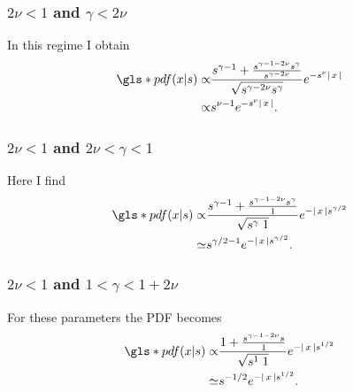 \subsubsection{$2\nu<1$ and $\gamma< 2\nu$ }

In this regime I obtain  
%
\begin{align}
\gls*{pdf}(x|s) \propto & \frac{s^{\gamma-1}+\frac{s^{\gamma-1-2\nu} s^{\gamma}}{s^{\gamma-2\nu}}}{\sqrt{s^{\gamma -2\nu}s^{\gamma}}} e^{-s^{\nu} \abs{x}} \\
\propto & s^{\nu - 1} e^{-s^{\nu} \abs{x}} .
\end{align}
%

\subsubsection{$2\nu<1$ and $2\nu <\gamma< 1$ }

Here I find 
%
\begin{align}
\gls*{pdf}(x|s) \propto & \frac{s^{\gamma-1}+\frac{s^{\gamma-1-2\nu} s^{\gamma}}{1}}{\sqrt{s^{\gamma } \; 1}} e^{-\abs{x} s^{\gamma/2}} \\
\simeq & s^{\gamma/2-1} e^{-\abs{x} s^{\gamma/2}} .
\end{align}
%

\subsubsection{$2\nu<1$ and $1 <\gamma< 1+2\nu$}

For these parameters the \gls*{PDF} becomes
%
\begin{align}
\gls*{pdf}(x|s) \propto & \frac{1+\frac{s^{\gamma-1-2\nu} s}{1}}{\sqrt{s^{1} \; 1}} e^{-\abs{x} s^{1/2}} \\
\simeq & s^{-1/2} e^{-\abs{x} s^{1/2}} .
\end{align}
%

